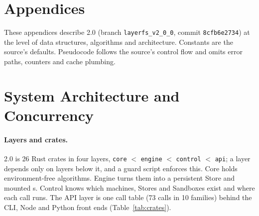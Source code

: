 
\clearpage
\appendix
\usetikzlibrary{patterns,decorations.pathmorphing}
\onecolumn
\section*{Appendices}

These appendices describe \sys{} 2.0 (branch \texttt{layerfs\_v2\_0\_0}, commit
\texttt{8cfb6e2734}) at the level of data structures, algorithms and architecture.
Constants are the source's defaults. Pseudocode follows the source's control flow and
omits error paths, counters and cache plumbing.

\section{System Architecture and Concurrency}
\label{app:arch}

\paragraph{Layers and crates.} \sys{} 2.0 is 26 Rust crates in four layers,
\texttt{core} $<$ \texttt{engine} $<$ \texttt{control} $<$ \texttt{api}; a layer depends
only on layers below it, and a guard script enforces this. Core holds environment-free
algorithms. Engine turns them into a persistent Store and mounted \ws{}s. Control knows
which machines, Stores and Sandboxes exist and where each call runs. The API layer is
one call table (73 calls in 10 families) behind the CLI, Node and Python front ends
(Table~\ref{tab:crates}).

